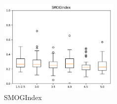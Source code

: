 \documentclass[12pt,journal,compsoc]{IEEEtran}
\begin{document}
\begin{minipage}{\linewidth}
  \begin{minipage}{0.25\linewidth}
      \begin{figure}[H]
          \includegraphics[width=2.3in]{../unigrams/scripts/boxplots/SMOGIndex.png}
          \caption{SMOGIndex}
      \end{figure}
  \end{minipage}
\end{minipage}
\end{document}
